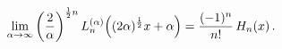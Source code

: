 \[\lim_{\alpha\to\infty}\left(\frac{2}{\alpha}\right)^{\frac{1}{2}n}\mathop{L^{(%
\alpha)}_{n}\/}\nolimits\!\left((2\alpha)^{\frac{1}{2}}x+\alpha\right)=\frac{(%
-1)^{n}}{n!}\mathop{H_{n}\/}\nolimits\!\left(x\right).\]